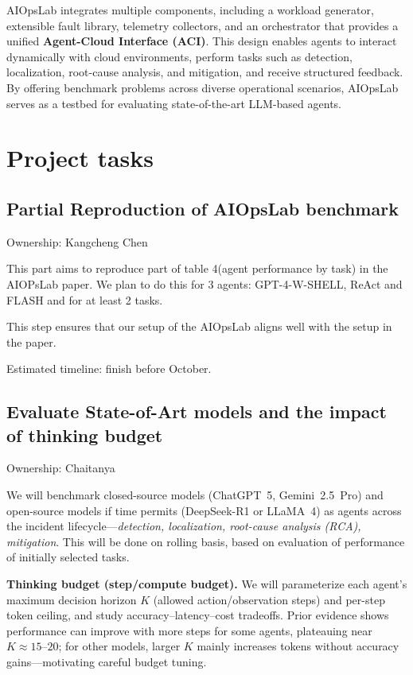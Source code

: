 \documentclass[conference]{IEEEtran}
\begin{document}
AIOpsLab integrates multiple components, including a workload generator, extensible fault library, telemetry collectors, and an orchestrator that provides a unified \textbf{Agent-Cloud Interface (ACI)}. This design enables agents to interact dynamically with cloud environments, perform tasks such as detection, localization, root-cause analysis, and mitigation, and receive structured feedback. By offering benchmark problems across diverse operational scenarios, AIOpsLab serves as a testbed for evaluating state-of-the-art LLM-based agents.

\section{Project tasks}
\subsection{Partial Reproduction of AIOpsLab benchmark}
Ownership: Kangcheng Chen

This part aims to reproduce part of table 4(agent performance by task) in the AIOPsLab paper. We plan to do this for 3 agents: GPT-4-W-SHELL, ReAct and FLASH and for at least 2 tasks.

This step ensures that our setup of the AIOpsLab aligns well with the setup in the paper.

Estimated timeline: finish before October. 
\subsection{Evaluate State-of-Art models and the impact of thinking budget}
Ownership: Chaitanya

We will benchmark closed-source models (ChatGPT~5, Gemini~2.5~Pro) and open-source models if time permits (DeepSeek-R1 or LLaMA~4) as agents across the incident lifecycle—\emph{detection, localization, root-cause analysis (RCA), mitigation}. This will be done on rolling basis, based on evaluation of performance of initially selected tasks. 

\textbf{Thinking budget (step/compute budget).} We will parameterize each agent’s maximum decision horizon $K$ (allowed action/observation steps) and per-step token ceiling, and study accuracy–latency–cost tradeoffs. Prior evidence shows performance can improve with more steps for some agents, plateauing near $K\!\approx\!15$–$20$; for other models, larger $K$ mainly increases tokens without accuracy gains—motivating careful budget tuning.
\end{document}
